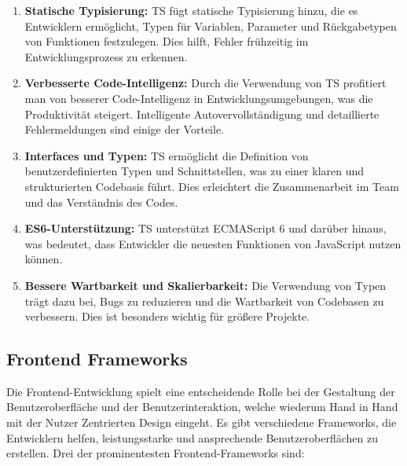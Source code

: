 \begin{enumerate}
    \item \textbf{Statische Typisierung:} \acl{TS} fügt statische Typisierung hinzu, die es Entwicklern ermöglicht, Typen für Variablen, Parameter und Rückgabetypen von Funktionen festzulegen. Dies hilft, Fehler frühzeitig im Entwicklungsprozess zu erkennen.

    \item \textbf{Verbesserte Code-Intelligenz:} Durch die Verwendung von \acl{TS} profitiert man von besserer Code-Intelligenz in Entwicklungsumgebungen, was die Produktivität steigert. Intelligente Autovervollständigung und detaillierte Fehlermeldungen sind einige der Vorteile.

    \item \textbf{Interfaces und Typen:} \acl{TS} ermöglicht die Definition von benutzerdefinierten Typen und Schnittstellen, was zu einer klaren und strukturierten Codebasis führt. Dies erleichtert die Zusammenarbeit im Team und das Verständnis des Codes.

    \item \textbf{ES6-Unterstützung:} \acl{TS} unterstützt ECMAScript 6 und darüber hinaus, was bedeutet, dass Entwickler die neuesten Funktionen von JavaScript nutzen können.

    \item \textbf{Bessere Wartbarkeit und Skalierbarkeit:} Die Verwendung von Typen trägt dazu bei, Bugs zu reduzieren und die Wartbarkeit von Codebasen zu verbessern. Dies ist besonders wichtig für größere Projekte.
\end{enumerate}

\subsection{Frontend Frameworks}
\label{chapter:3-frontend-frameworks}

Die Frontend-Entwicklung spielt eine entscheidende Rolle bei der Gestaltung der Benutzeroberfläche und der Benutzerinteraktion, welche wiederum Hand in Hand mit der Nutzer Zentrierten Design eingeht. Es gibt verschiedene Frameworks, die Entwicklern helfen, leistungsstarke und ansprechende Benutzeroberflächen zu erstellen. Drei der prominentesten Frontend-Frameworks sind:


